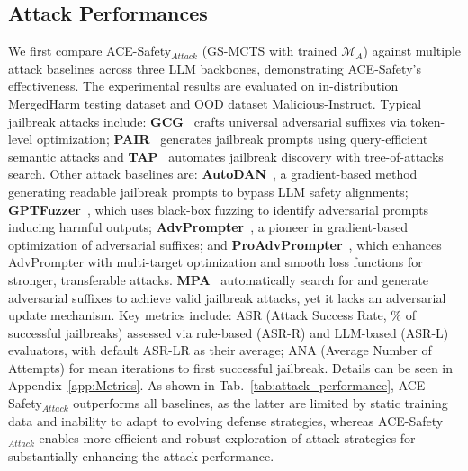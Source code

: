 \documentclass[11pt]{article}
\def\framework{ACE-Safety}
\def\attackmethod{GS-MCTS}
\begin{document}
\subsection{Attack Performances} 
We first compare {\framework}$_{Attack}$ ({\attackmethod} with trained $\mathcal{M}_{A}$) against multiple attack baselines across three LLM backbones, demonstrating {\framework}'s effectiveness. The experimental results are evaluated on in-distribution MergedHarm testing dataset and OOD dataset Malicious-Instruct. Typical jailbreak attacks include: \textbf{GCG}~\citep{GCG} crafts universal adversarial suffixes via token-level optimization; \textbf{PAIR}~\citep{PAIR} generates jailbreak prompts using query-efficient semantic attacks and \textbf{TAP}~\citep{TAP} automates jailbreak discovery with tree-of-attacks search. Other attack baselines are: \textbf{AutoDAN}~\citep{AutoDAN}, a gradient-based method generating readable jailbreak prompts to bypass LLM safety alignments; \textbf{GPTFuzzer}~\citep{gptfuzzer}, which uses black-box fuzzing to identify adversarial prompts inducing harmful outputs; \textbf{AdvPrompter}~\citep{advprompter}, a pioneer in gradient-based optimization of adversarial suffixes; and \textbf{ProAdvPrompter}~\citep{ProAdvPrompter}, which enhances AdvPrompter with multi-target optimization and smooth loss functions for stronger, transferable attacks. \textbf{MPA}~\citep{MPA} automatically search for and generate adversarial suffixes to achieve valid jailbreak attacks, yet it lacks an adversarial update mechanism. Key metrics include: ASR (Attack Success Rate, \% of successful jailbreaks) assessed via rule-based (ASR-R) and LLM-based (ASR-L) evaluators, with default ASR-LR as their average; ANA (Average Number of Attempts) for mean iterations to first successful jailbreak. Details can be seen in Appendix~\ref{app:Metrics}. As shown in Tab.~\ref{tab:attack_performance}, {\framework}$_{Attack}$ outperforms all baselines, as the latter are limited by static training data and inability to adapt to evolving defense strategies, whereas {\framework}$_{Attack}$ enables more efficient and robust exploration of attack strategies for substantially enhancing the attack performance.
\end{document}
